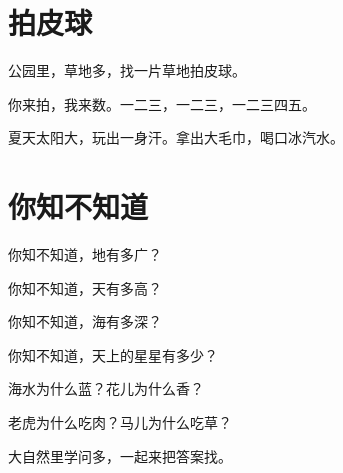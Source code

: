 \documentclass[12pt,UTF-8,openany]{ctexbook}
\begin{document}
\hanzibox{}\hanzibox{}\hanzibox{}\hanzibox{}\hspace{1em}\hanzibox{}\hanzibox{}\hanzibox{}\hanzibox{}






\chapter{拍皮球}

\begin{large}
    
    公园里，草地多，找一片草地拍皮球。
    
    你来拍，我来数。一二三，一二三，一二三四五。
    
    夏天太阳大，玩出一身汗。拿出大毛巾，喝口冰汽水。
    
\end{large}


\clearpage

\begin{center}
    
\end{center}


\hanzibox{}\hanzibox{}\hanzibox{}\hanzibox{}\hspace{1em}\hanzibox{}\hanzibox{}\hanzibox{}\hanzibox{}

\hanzibox{}\hanzibox{}\hanzibox{}\hanzibox{}\hspace{1em}\hanzibox{}\hanzibox{}\hanzibox{}\hanzibox{}

\hanzibox{}\hanzibox{}\hanzibox{}\hanzibox{}\hspace{1em}\hanzibox{}\hanzibox{}\hanzibox{}\hanzibox{}

\hanzibox{}\hanzibox{}\hanzibox{}\hanzibox{}\hspace{1em}




\chapter{你知不知道}

\begin{large}
    
    你知不知道，地有多广？
    
    你知不知道，天有多高？
    
    你知不知道，海有多深？
    
    你知不知道，天上的星星有多少？
    
    海水为什么蓝？花儿为什么香？
    
    老虎为什么吃肉？马儿为什么吃草？
    
    大自然里学问多，一起来把答案找。
    
\end{large}
\end{document}
